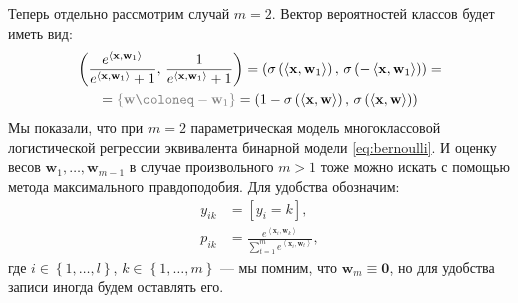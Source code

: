 \documentclass[12pt]{article}
\renewcommand{\vec}[1]{\mathbf{#1}}
\newcommand\mbtw[1]{{\color{gray}#1}}
\begin{document}
Теперь отдельно рассмотрим случай $m=2$. Вектор вероятностей классов будет иметь вид:
\begin{gather*}
    \left(
        \frac{e^{\left<\vec{x},\vec{w}_1\right>}}
             {e^{\left<\vec{x},\vec{w}_1\right>}+1},\,
        \frac{1}
             {e^{\left<\vec{x},\vec{w}_1\right>}+1}
    \right)
    =
    \left( 
        \sigma\left( \left<\vec{x},\vec{w}_1\right> \right),\,
        \sigma\left( -\left<\vec{x},\vec{w}_1\right> \right)
    \right) = \\
    = 
    \mbtw{\left\{ \vec{w}\coloneq-\vec{w}_1 \right\}}
    =
    \left( 
        1-\sigma\left( \left<\vec{x}, \vec{w}\right> \right),\,
        \sigma\left( \left<\vec{x}, \vec{w}\right> \right)
    \right)
\end{gather*}
Мы показали, что при $m=2$ параметрическая модель многоклассовой логистической регрессии эквивалента бинарной модели \eqref{eq:bernoulli}. И оценку весов $\vec{w}_1,\dots,\vec{w}_{m-1}$ в случае произвольного $m>1$ тоже можно искать с помощью метода максимального правдоподобия. Для удобства обозначим:
\begin{align*}
    y_{ik} &= [y_i = k], \\
    p_{ik} &= \frac{e^{\left<\vec{x}_i, \vec{w}_k\right>}}{\sum_{t=1}^{m} e^{\left<\vec{x}_i, \vec{w}_t\right>}},
\end{align*}
где $i\in \left\{ 1,\dots,l \right\}$, $k\in \left\{ 1,\dots,m \right\}$ — мы помним, что $\vec{w}_m\equiv \vec{0}$, но для удобства записи иногда будем оставлять его.
\end{document}
